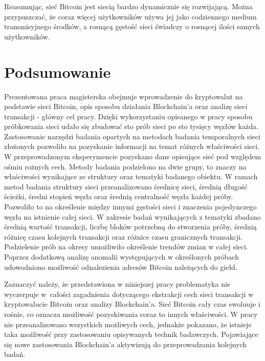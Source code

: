 \documentclass[12pt, oneside, final, openany]{mgr}
\begin{document}
\indent Reasumując, sieć Bitcoin jest siecią bardzo dynamicznie się rozwijającą. Można przypuszczać, że coraz więcej użytkowników używa jej jako codziennego medium transmisyjnego środków, a rosnącą gęstość sieci świadczy o rosnącej ilości samych użytkowników. 


\chapter*{Podsumowanie}

\indent Prezentowana praca magisterska obejmuje wprowadzenie do kryptowalut na podstawie sieci Bitcoin, opis sposobu działania Blockchain'a oraz analizę sieci transakcji - główny cel pracy. Dzięki wykorzystaniu opisanego w pracy sposobu próbkowania sieci udało się zbudować sto prób sieci po sto tysięcy węzłów każda. Zastosowanie narzędzi badania opartych na metodach badania temporalnych sieci złożonych pozwoliło na pozyskanie informacji na temat różnych właściwości sieci. W przeprowadzonym eksperymencie pozyskano dane opisujące sieć pod względem ośmiu rożnych cech. Metody badania podzielono na dwie grupy, to znaczy na właściwości wynikające ze struktury oraz tematyki badanego obiektu. W ramach metod badania struktury sieci przeanalizowano średnicę sieci, średnią długość ścieżki, średni stopień węzła oraz średnią centralność węzła każdej próby. Pozwoliło to na określenie między innymi gęstości sieci i znaczenia pojedynczego węzła na istnienie całej sieci. W zakresie badań wynikających z tematyki zbadano średnią wartość transakcji, liczbę bloków potrzebną do stworzenia próby, średnią różnicę czasu kolejnych transakcji oraz różnice czasu granicznych transakcji. Podzielenie prób na okresy umożliwiło określenie trendów zmian w całej sieci. Poprzez dodatkową analizę anomalii występujących w określonych próbach udowodniono możliwość odnalezienia adresów Bitcoin należących do giełd.

\indent Zaznaczyć należy, że przedstawiona w niniejszej pracy problematyka nie wyczerpuje w~całości zagadnienia dotyczącego ekstrakcji cech sieci transakcji w kryptowalucie Bitcoin oraz analizy Blockchain'a. Sieć Bitcoin cały czas ewoluuje i rośnie, co oznacza możliwość pozyskiwania coraz to innych właściwości. W pracy nie przeanalizowano wszystkich możliwych cech, jednakże pokazano, że istnieje taka możliwość przy zastosowaniu opisywanych technik badawczych. Pojawiające się nowe zastosowania Blockchain'a aktywizują do przeprowadzania kolejnych badań.
\end{document}
